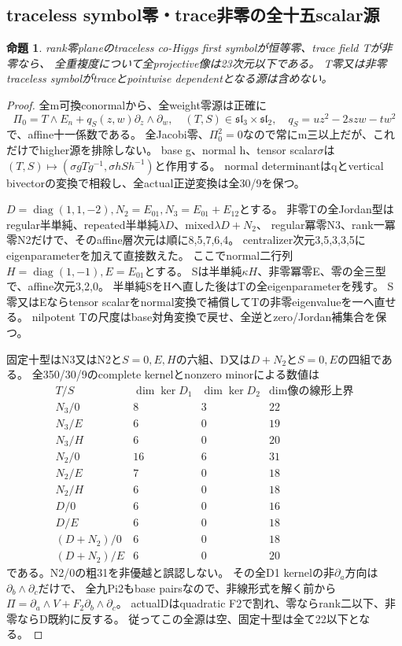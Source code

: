 \documentclass[a4paper,11pt]{ltjsarticle}
\newtheorem{proposition}{命題}[section]
\theoremstyle{definition}
\begin{document}
\subsection{traceless symbol零・trace非零の全十五scalar源}
\begin{proposition}\label{prop:plane-scalar-nonzero-trace-G}
rank零planeのtraceless co-Higgs first symbolが恒等零、trace field Tが非零なら、
全重複度について全projective像は23次元以下である。
T零又は非零traceless symbolがtraceとpointwise dependentとなる源は含めない。
\end{proposition}
\begin{proof}
全m可換conormalから、全weight零源は正確に
\[
 \Pi_0=T\wedge E_n+q_S(z,w)\partial_z\wedge\partial_w,
 \quad(T,S)\in\mathfrak{sl}_3\times\mathfrak{sl}_2,\quad
 q_S=uz^2-2szw-tw^2
\]
で、affine十一係数である。
全Jacobi零、$\Pi_0^2=0$なので常にm三以上だが、これだけでhigher源を排除しない。
base g、normal h、tensor scalar$\sigma$は
$(T,S)\mapsto(\sigma gTg^{-1},\sigma hSh^{-1})$と作用する。
normal determinantはqとvertical bivectorの変換で相殺し、全actual正逆変換は全30/9を保つ。

$D=\operatorname{diag}(1,1,-2),N_2=E_{01},N_3=E_{01}+E_{12}$とする。
非零Tの全Jordan型はregular半単純、repeated半単純$\lambda D$、mixed$\lambda D+N_2$、
regular冪零N3、rank一冪零N2だけで、そのaffine層次元は順に8,5,7,6,4。
centralizer次元3,5,3,3,5にeigenparameterを加えて直接数えた。
ここでnormal二行列$H=\operatorname{diag}(1,-1),E=E_{01}$とする。
Sは半単純$\kappa H$、非零冪零E、零の全三型で、affine次元3,2,0。
半単純SをHへ直した後はTの全eigenparameterを残す。
S零又はEならtensor scalarをnormal変換で補償してTの非零eigenvalueを一へ直せる。
nilpotent Tの尺度はbase対角変換で戻せ、全逆とzero/Jordan補集合を保つ。

固定十型はN3又はN2と$S=0,E,H$の六組、D又は$D+N_2$と$S=0,E$の四組である。
全350/30/9のcomplete kernelとnonzero minorによる数値は
\[
\begin{array}{c|rr|r}
 T/S&\dim\ker D_1&\dim\ker D_2&\dim\text{像の線形上界}\\\hline
 N_3/0&8&3&22\\
 N_3/E&6&0&19\\
 N_3/H&6&0&20\\
 N_2/0&16&6&31\\
 N_2/E&7&0&18\\
 N_2/H&6&0&18\\
 D/0&6&0&16\\
 D/E&6&0&18\\
 (D+N_2)/0&6&0&18\\
 (D+N_2)/E&6&0&20
\end{array}
\]
である。N2/0の粗31を非優越と誤認しない。
その全D1 kernelの非$\partial_a$方向は$\partial_b\wedge\partial_c$だけで、
全九Pi2もbase pairsなので、非線形式を解く前から
$\Pi=\partial_a\wedge V+F_2\partial_b\wedge\partial_c$。
actualDはquadratic F2で割れ、零ならrank二以下、非零ならD既約に反する。
従ってこの全源は空、固定十型は全て22以下となる。


\end{proof}
\end{document}
